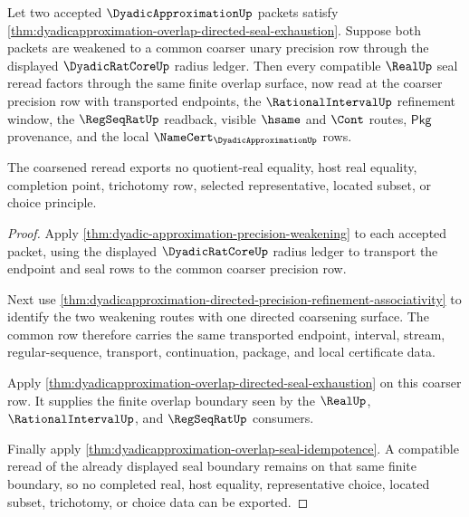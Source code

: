 \begin{theorem}\label{thm:dyadicapproximation-overlap-coarsening-seal-stability}
Let two accepted $\DyadicApproximationUp$ packets satisfy
\autoref{thm:dyadicapproximation-overlap-directed-seal-exhaustion}. Suppose
both packets are weakened to a common coarser unary precision row through the
displayed $\DyadicRatCoreUp$ radius ledger. Then every compatible $\RealUp$
seal reread factors through the same finite overlap surface, now read at the
coarser precision row with transported endpoints, the
$\RationalIntervalUp$ refinement window, the $\RegSeqRatUp$ readback, visible
$\hsame$ and $\Cont$ routes, $\mathsf{Pkg}$ provenance, and the local
$\NameCert_{\DyadicApproximationUp}$ rows.

The coarsened reread exports no quotient-real equality, host real equality,
completion point, trichotomy row, selected representative, located subset, or
choice principle.
\end{theorem}
\begin{proof}
Apply \autoref{thm:dyadic-approximation-precision-weakening} to each accepted
packet, using the displayed $\DyadicRatCoreUp$ radius ledger to transport the
endpoint and seal rows to the common coarser precision row.

Next use
\autoref{thm:dyadicapproximation-directed-precision-refinement-associativity}
to identify the two weakening routes with one directed coarsening surface. The
common row therefore carries the same transported endpoint, interval, stream,
regular-sequence, transport, continuation, package, and local certificate
data.

Apply \autoref{thm:dyadicapproximation-overlap-directed-seal-exhaustion} on
this coarser row. It supplies the finite overlap boundary seen by the
$\RealUp$, $\RationalIntervalUp$, and $\RegSeqRatUp$ consumers.

Finally apply \autoref{thm:dyadicapproximation-overlap-seal-idempotence}. A
compatible reread of the already displayed seal boundary remains on that same
finite boundary, so no completed real, host equality, representative choice,
located subset, trichotomy, or choice data can be exported.
\end{proof}


